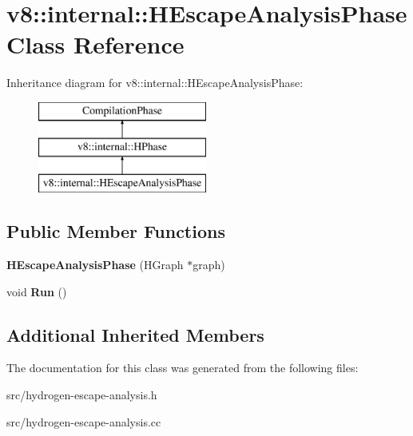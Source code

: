 \hypertarget{classv8_1_1internal_1_1_h_escape_analysis_phase}{}\section{v8\+:\+:internal\+:\+:H\+Escape\+Analysis\+Phase Class Reference}
\label{classv8_1_1internal_1_1_h_escape_analysis_phase}
Inheritance diagram for v8\+:\+:internal\+:\+:H\+Escape\+Analysis\+Phase\+:\begin{figure}[H]
\begin{center}
\leavevmode
\includegraphics[height=3.000000cm]{classv8_1_1internal_1_1_h_escape_analysis_phase}
\end{center}
\end{figure}
\subsection*{Public Member Functions}
\begin{DoxyCompactItemize}
\item 
\hypertarget{classv8_1_1internal_1_1_h_escape_analysis_phase_ac66c85fedf2119f66dc528b466435938}{}{\bfseries H\+Escape\+Analysis\+Phase} (H\+Graph $\ast$graph)\label{classv8_1_1internal_1_1_h_escape_analysis_phase_ac66c85fedf2119f66dc528b466435938}

\item 
\hypertarget{classv8_1_1internal_1_1_h_escape_analysis_phase_a2f88b7156ec353b5590d1bc189f22061}{}void {\bfseries Run} ()\label{classv8_1_1internal_1_1_h_escape_analysis_phase_a2f88b7156ec353b5590d1bc189f22061}

\end{DoxyCompactItemize}
\subsection*{Additional Inherited Members}


The documentation for this class was generated from the following files\+:\begin{DoxyCompactItemize}
\item 
src/hydrogen-\/escape-\/analysis.\+h\item 
src/hydrogen-\/escape-\/analysis.\+cc\end{DoxyCompactItemize}
